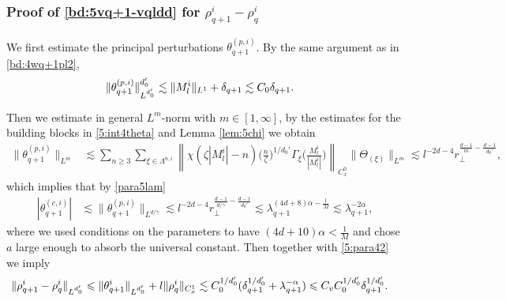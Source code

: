\documentclass[10pt,a4paper]{amsart}
\numberwithin{equation}{section}
\def\({{\Big(}}
\def\){{\Big)}}
\newcommand{\norm}[1]{\left\|#1\right\|}
\def\geq{\geqslant}
\def\leq{\leqslant}
\def\({{\Big(}}
\def\){{\Big)}}
\def\geq{\geqslant}
\def\leq{\leqslant}
\begin{document}
\subsubsection{Proof of  \eqref{bd:5vq+1-vqldd} for $  \rho^i_{q+1}-\rho^i_q$}\label{sec:5esttheq+1}
We first estimate the principal perturbations  $\theta^{(p,i)}_{q+1}$. By the same argument as in \eqref{bd:4wq+1pl2}, %
\begin{align}
\|\theta_{q+1}^{(p,i)}\|^{d_0'}_{L^{d_0'}} 
&\lesssim \|M^i_l \|_{L^1}+ \delta_{q+1}\lesssim C_0 \delta_{q+1}
.\notag
\end{align}


Then we estimate in  general $L^m$-norm with $m\in[1,\infty]$, by the estimates for the building blocks in \eqref{5:int4theta}  and Lemma \ref{lem:5chi} we obtain
\begin{align}
\|\theta_{q+1}^{(p,i)} \|_{L^{m}}&\lesssim\sum_{n\geq3}\sum_{\xi\in\Lambda^{n,i}}\norm{\chi(\zeta |M^i_l|-n)\(\frac{n}{\zeta }\)^{1/d_0'}\Gamma_{\xi}\(\frac{M^i_l}{|M^i_l|}\)}_{C_{x}^0}\|\Theta_{ (\xi)} \|_{L^{m}}\lesssim l^{-2d-4}r_\perp^{\frac{d-1}{m}-\frac{d-1}{d_0'}} ,\label{bd:5theq+1plp}
\end{align}
which implies that  by \eqref{para5lam}
\begin{align}
|\theta_{q+1}^{(c,i)} |&\lesssim\|\theta_{q+1}^{(p,i)}\|_{L^{d/\gamma}}\lesssim l^{-2d-4}r_\perp^{\frac{d-1}{d/\gamma}-\frac{d-1}{d_0'}}\lesssim\lambda_{q+1}^{(4d+8)\alpha-\frac1M}\lesssim \lambda_{q+1}^{-2\alpha}, \label{bd:5theq+1clp} 
\end{align}
where we used  conditions on the parameters to have $(4d+10)\alpha<\frac1{M}$ and chose $a$ large enough to absorb the universal constant.
Then together with \eqref{5:para42}    we imply 
\begin{align}
\|  \rho^i_{q+1}-  \rho^i_q\|_{  L^{d_0'}}
&\leq\|\theta^i _{q+1}\|_{  L^{d_0'}}+l\|  \rho^i_{q}\|_{ C_{x}^1} \lesssim C_0^{1/{d_0'}}(\delta_{q+1}^{1/{d_0'}}+\lambda_{q+1}^{-\alpha})\leq C_v C_0^{1/{d_0'}}\delta_{q+1}^{1/{d_0'}}.\notag
\end{align}
\end{document}

